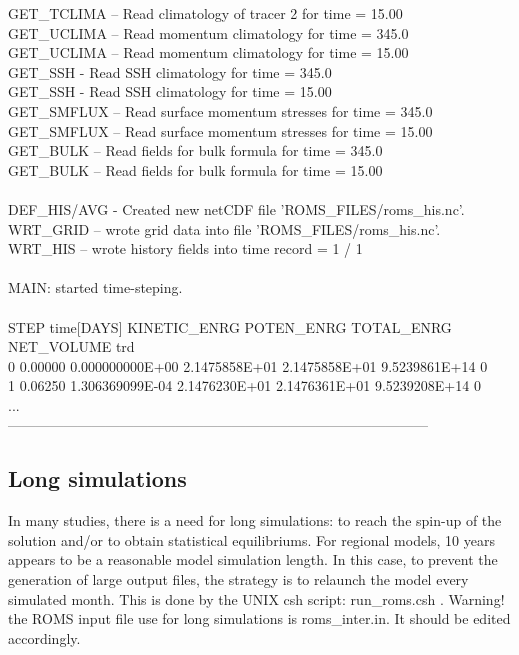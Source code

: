 GET\_TCLIMA -- Read climatology of tracer   2 for time =    15.00 \\
GET\_UCLIMA -- Read momentum climatology      for time =    345.0 \\
GET\_UCLIMA -- Read momentum climatology      for time =    15.00 \\
GET\_SSH     - Read SSH climatology           for time =    345.0 \\
GET\_SSH     - Read SSH climatology           for time =    15.00 \\
GET\_SMFLUX -- Read surface momentum stresses for time =    345.0 \\
GET\_SMFLUX -- Read surface momentum stresses for time =    15.00 \\
GET\_BULK   -- Read fields for bulk formula   for time =    345.0 \\
GET\_BULK   -- Read fields for bulk formula   for time =    15.00 \\
\\
DEF\_HIS/AVG - Created new netCDF file 'ROMS\_FILES/roms\_his.nc'.\\
WRT\_GRID -- wrote grid data into file 'ROMS\_FILES/roms\_his.nc'.\\
WRT\_HIS -- wrote history fields into time record =   1 /   1\\
\\
MAIN: started time-steping.\\
\\
STEP   time[DAYS] KINETIC\_ENRG    POTEN\_ENRG    TOTAL\_ENRG    NET\_VOLUME   trd\\
0     0.00000 0.000000000E+00 2.1475858E+01 2.1475858E+01 9.5239861E+14  0\\
1     0.06250 1.306369099E-04 2.1476230E+01 2.1476361E+01 9.5239208E+14  0\\
...\\
------------------------------------------------------------------------------------------\\

\subsection{Long simulations}

In many studies, there is a need for long simulations: to reach the spin-up of 
the solution and/or to obtain statistical equilibriums.
For regional models, 10 years appears to be a reasonable model simulation length.
In this case, to prevent the generation of large output files, the strategy 
is to relaunch the model every simulated month.
This is done by the UNIX csh script: run\_roms.csh .
Warning! the ROMS input file use for long simulations is roms\_inter.in.
It should be edited accordingly.


